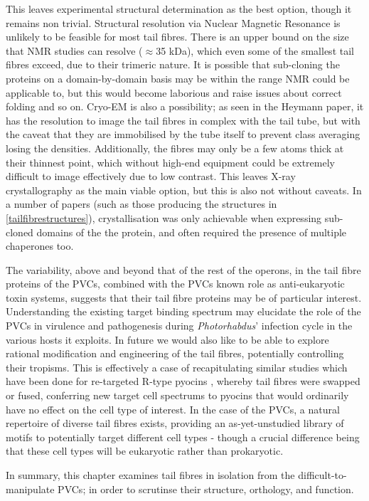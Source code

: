 This leaves experimental structural determination as the best option, though it remains non trivial. Structural resolution via Nuclear Magnetic Resonance is unlikely to be feasible for most tail fibres. There is an upper bound on the size that NMR studies can resolve ($\approx$35 kDa), which even some of the smallest tail fibres exceed, due to their trimeric nature. It is possible that sub-cloning the proteins on a domain-by-domain basis may be within the range NMR could be applicable to, but this would become laborious and raise issues about correct folding and so on. Cryo-EM is also a possibility; as seen in the Heymann paper, it has the resolution to image the tail fibres in complex with the tail tube, but with the caveat that they are immobilised by the tube itself to prevent class averaging losing the densities. Additionally, the fibres may only be a few atoms thick at their thinnest point, which without high-end equipment could be extremely difficult to image effectively due to low contrast. This leaves X-ray crystallography as the main viable option, but this is also not without caveats. In a number of papers (such as those producing the structures in \vref{tailfibrestructures}), crystallisation was only achievable when expressing sub-cloned domains of the the protein, and often required the presence of multiple chaperones too.

The variability, above and beyond that of the rest of the operons, in the tail fibre proteins of the PVCs, combined with the PVCs known role as anti-eukaryotic toxin systems, suggests that their tail fibre proteins may be of particular interest. Understanding the existing target binding spectrum may elucidate the role of the PVCs in virulence and pathogenesis during \emph{Photorhabdus}' infection cycle in the various hosts it exploits. In future we would also like to be able to explore rational modification and engineering of the tail fibres, potentially controlling their tropisms. This is effectively a case of recapitulating similar studies which have been done for re-targeted R-type pyocins \citep{Scholl2009a}, whereby tail fibres were swapped or fused, conferring new target cell spectrums to pyocins that would ordinarily have no effect on the cell type of interest. In the case of the PVCs, a natural repertoire of diverse tail fibres exists, providing an as-yet-unstudied library of motifs to potentially target different cell types - though a crucial difference being that these cell types will be eukaryotic rather than prokaryotic.

In summary, this chapter examines tail fibres in isolation from the difficult-to-manipulate PVCs; in order to scrutinse their structure, orthology, and function.

